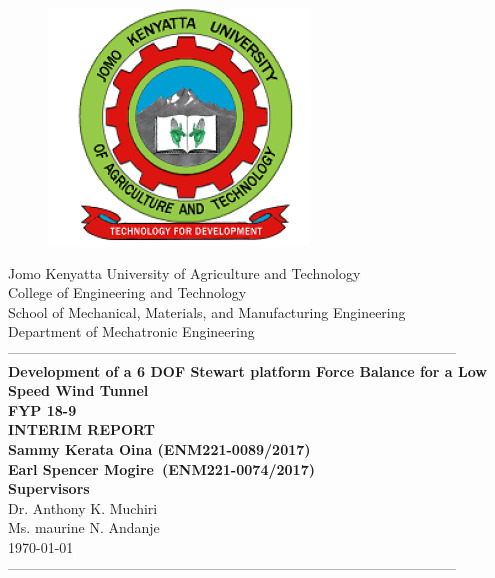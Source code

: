\documentclass[12pt,fleqn]{report}
\begin{document}
\begin{titlepage}
  \begin{center}
      \vspace*{-4.0cm}
    \begin{figure}[!h]
\centering
\includegraphics[width=0.3\linewidth]{Figures/JKUAT_logo}
\label{fig:jomologo}
\end{figure}
   \large{Jomo Kenyatta University of Agriculture and Technology}\\
    \large{College of Engineering and Technology}\\
    \large{School of Mechanical, Materials, and Manufacturing Engineering}\\
   \large{Department of Mechatronic Engineering}\\

    ------------------------------------------------------------------------------------------------\\[1.0cm]
    \LARGE{\textbf{Development of a 6 DOF Stewart platform
        Force Balance for a Low Speed Wind Tunnel}}\\[0.6cm]
    \LARGE{\textbf{FYP 18-9
            }}\\
    \LARGE{\textbf{INTERIM REPORT
                }}\\[0.6cm]

    \vspace{0.5cm}
    \large{\textbf{Sammy Kerata Oina (ENM221-0089/2017)
            }}\\
     \large{\textbf{Earl Spencer Mogire~(ENM221-0074/2017)
            }}\\[0.6cm]
    \large{\textbf{Supervisors}}\\
    \large{Dr. Anthony K. Muchiri
                }\\
         \large{Ms. maurine N. Andanje}\\
    \large{\small{\today}}\\
    ------------------------------------------------------------------------------------------------\\[1.5cm]
  \end{center}
\end{titlepage}
%
\end{document}
